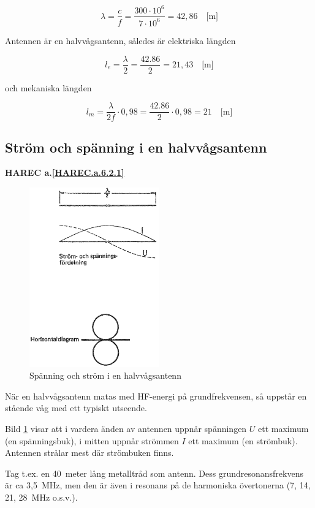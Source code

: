 \[
\lambda = \frac{c}{f} = \frac{300 \cdot 10^6}{7 \cdot 10^6} = 42,86
\quad \text{[m]}
\]

Antennen är en halvvågsantenn, således är elektriska längden

\[
l_e = \frac{\lambda}{2} = \frac{42.86}{2} = 21,43 \quad \text{[m]}
\]

och mekaniska längden

\[
l_m = \frac{\lambda}{2f} \cdot 0,98 = \frac{42.86}{2}\cdot 0,98 = 21
\quad \text{[m]}
\]


\subsection{Ström och spänning i en halvvågsantenn}
\textbf{
HAREC a.\ref{HAREC.a.6.2.1}\label{myHAREC.a.6.2.1}
}

\begin{figure}
  \includegraphics[width=0.5\textwidth]{images/cropped_pdfs/bild_2_6-01.pdf}
  \caption{Spänning och ström i en halvvågsantenn}
  \label{fig:bildII6-1}
\end{figure}

När en halvvågsantenn matas med HF-energi på grundfrekvensen, så
uppstår en stående våg med ett typiskt utseende.

Bild \ref{fig:bildII6-1} visar att i vardera änden av antennen uppnår spänningen
\(U\) ett maximum (en spänningsbuk), i mitten uppnår strömmen \(I\)
ett maximum (en strömbuk).
Antennen strålar mest där strömbuken finns.

Tag t.ex. en 40~meter lång metalltråd som antenn. Dess
grundresonansfrekvens är ca 3,5~MHz, men den är även i resonans på de
harmoniska övertonerna (7, 14, 21, 28~MHz o.s.v.).

